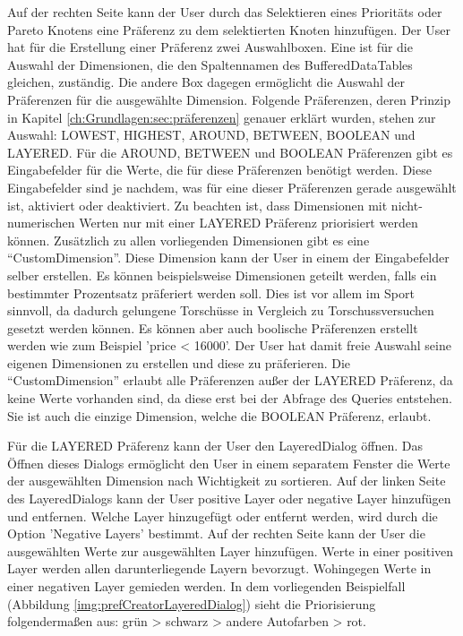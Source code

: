 Auf der rechten Seite kann der User durch das Selektieren eines Prioritäts oder Pareto Knotens eine Präferenz zu dem selektierten Knoten hinzufügen. Der User hat für die Erstellung einer Präferenz zwei Auswahlboxen. Eine ist für die Auswahl der Dimensionen, die den Spaltennamen des BufferedDataTables gleichen, zuständig. Die andere Box dagegen ermöglicht die Auswahl der Präferenzen für die ausgewählte Dimension. Folgende Präferenzen, deren Prinzip in Kapitel \ref{ch:Grundlagen:sec:präferenzen} genauer erklärt wurden, stehen zur Auswahl: LOWEST, HIGHEST, AROUND, BETWEEN, BOOLEAN und LAYERED. Für die AROUND, BETWEEN und BOOLEAN Präferenzen gibt es Eingabefelder für die Werte, die für diese Präferenzen benötigt werden. Diese Eingabefelder sind je nachdem, was für eine dieser Präferenzen gerade ausgewählt ist, aktiviert oder deaktiviert. Zu beachten ist, dass Dimensionen mit nicht-numerischen Werten nur mit einer LAYERED Präferenz priorisiert werden können. 
Zusätzlich zu allen vorliegenden Dimensionen gibt es eine \enquote{CustomDimension}. Diese Dimension kann der User in einem der Eingabefelder selber erstellen. Es können beispielsweise Dimensionen geteilt werden, falls ein bestimmter Prozentsatz präferiert werden soll. Dies ist vor allem im Sport sinnvoll, da dadurch gelungene Torschüsse in Vergleich zu Torschussversuchen gesetzt werden können. Es können aber auch boolische Präferenzen erstellt werden wie zum Beispiel 'price < 16000'. Der User hat damit freie Auswahl seine eigenen Dimensionen zu erstellen und diese zu präferieren. Die \enquote{CustomDimension} erlaubt alle Präferenzen außer der LAYERED Präferenz, da keine Werte vorhanden sind, da diese erst bei der Abfrage des Queries entstehen. Sie ist auch die einzige Dimension, welche die BOOLEAN Präferenz, erlaubt. 

Für die LAYERED Präferenz kann der User den LayeredDialog öffnen. Das Öffnen dieses Dialogs ermöglicht den User in einem separatem Fenster die Werte der ausgewählten Dimension nach Wichtigkeit zu sortieren.
Auf der linken Seite des LayeredDialogs kann der User positive Layer oder negative Layer hinzufügen und entfernen. Welche Layer hinzugefügt oder entfernt werden, wird durch die Option 'Negative Layers' bestimmt. Auf der rechten Seite kann der User die ausgewählten Werte zur ausgewählten Layer hinzufügen. Werte in einer positiven Layer werden allen darunterliegende Layern bevorzugt. Wohingegen Werte in einer negativen Layer gemieden werden. In dem vorliegenden Beispielfall (Abbildung \ref{img:prefCreatorLayeredDialog}) sieht die Priorisierung folgendermaßen aus: grün > schwarz > andere Autofarben > rot. 

